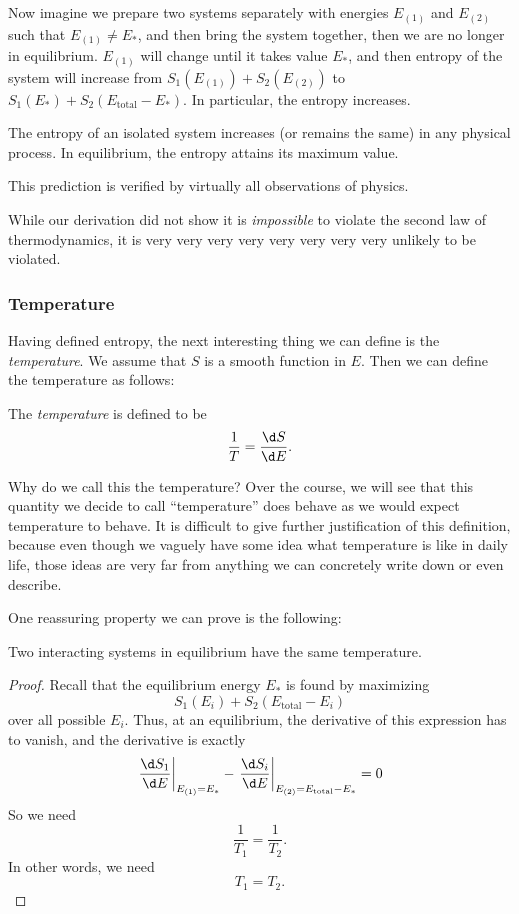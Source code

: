 \documentclass[a4paper]{article}
\begin{document}
Now imagine we prepare two systems separately with energies $E_{(1)}$ and $E_{(2)}$ such that $E_{(1)} \not= E_*$, and then bring the system together, then we are no longer in equilibrium. $E_{(1)}$ will change until it takes value $E_*$, and then entropy of the system will increase from $S_1(E_{(1)}) + S_2(E_{(2)})$ to $S_1(E_*) + S_2(E_{\mathrm{total}} - E_*)$. In particular, the entropy increases.
\begin{law}
  The entropy of an isolated system increases (or remains the same) in any physical process. In equilibrium, the entropy attains its maximum value.
\end{law}
This prediction is verified by virtually all observations of physics.

While our derivation did not show it is \emph{impossible} to violate the second law of thermodynamics, it is very very very very very very very very unlikely to be violated.

\subsubsection*{Temperature}
Having defined entropy, the next interesting thing we can define is the \emph{temperature}. We assume that $S$ is a smooth function in $E$. Then we can define the temperature as follows:
\begin{defi}[Temperature]
  The \emph{temperature} is defined to be
  \[
    \frac{1}{T} = \frac{\d S}{\d E}.
  \]
\end{defi}
Why do we call this the temperature? Over the course, we will see that this quantity we decide to call ``temperature'' does behave as we would expect temperature to behave. It is difficult to give further justification of this definition, because even though we vaguely have some idea what temperature is like in daily life, those ideas are very far from anything we can concretely write down or even describe.

One reassuring property we can prove is the following:
\begin{prop}
  Two interacting systems in equilibrium have the same temperature.
\end{prop}

\begin{proof}
  Recall that the equilibrium energy $E_*$ is found by maximizing
  \[
    S_1(E_i) + S_2(E_{\mathrm{total}} - E_i)
  \]
  over all possible $E_i$. Thus, at an equilibrium, the derivative of this expression has to vanish, and the derivative is exactly
  \[
    \left.\frac{\d S_1}{\d E}\right|_{E_{(1)} = E_*} - \left.\frac{\d S_i}{\d E} \right|_{E_{(2)} = E_{\mathrm{total}} - E_*} = 0
  \]
  So we need
  \[
    \frac{1}{T_1} = \frac{1}{T_2}.
  \]
  In other words, we need
  \[
    T_1 = T_2.
  \]
\end{proof}
\end{document}
